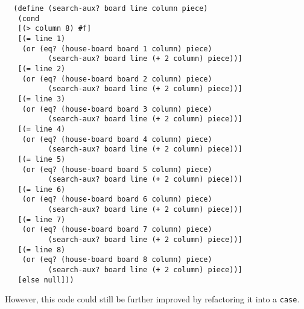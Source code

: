 \begin{lstlisting}
  (define (search-aux? board line column piece)
   (cond
   [(> column 8) #f]
   [(= line 1)
    (or (eq? (house-board board 1 column) piece)
          (search-aux? board line (+ 2 column) piece))]
   [(= line 2)
    (or (eq? (house-board board 2 column) piece)
          (search-aux? board line (+ 2 column) piece))]
   [(= line 3)
    (or (eq? (house-board board 3 column) piece)
          (search-aux? board line (+ 2 column) piece))]
   [(= line 4)
    (or (eq? (house-board board 4 column) piece)
          (search-aux? board line (+ 2 column) piece))]
   [(= line 5)
    (or (eq? (house-board board 5 column) piece)
          (search-aux? board line (+ 2 column) piece))]
   [(= line 6)
    (or (eq? (house-board board 6 column) piece)
          (search-aux? board line (+ 2 column) piece))]
   [(= line 7)
    (or (eq? (house-board board 7 column) piece)
          (search-aux? board line (+ 2 column) piece))]
   [(= line 8)
    (or (eq? (house-board board 8 column) piece)
          (search-aux? board line (+ 2 column) piece))]
   [else null]))
\end{lstlisting}

However, this code could still be further improved by refactoring it into a {\tt case}. \\


